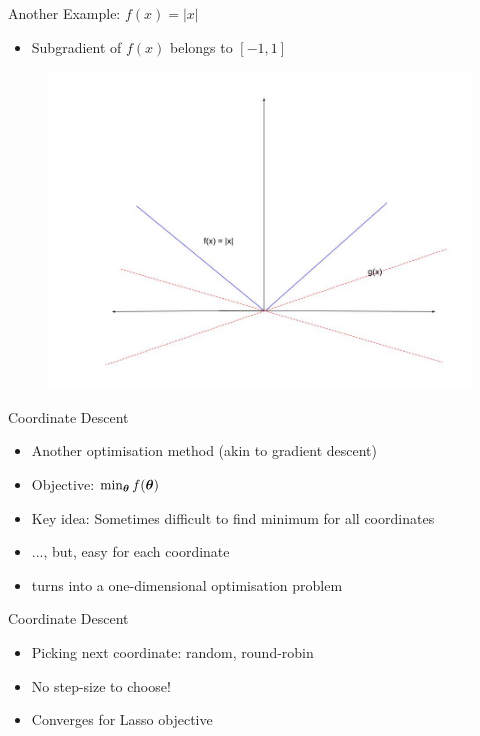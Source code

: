 \documentclass{beamer}
\begin{document}
\begin{frame}{Another Example: $f(x) = |x|$}

\begin{itemize}
\item Subgradient of $f(x)$ belongs to $[-1, 1]$
\end{itemize}
\begin{figure}
\centering
\includegraphics[scale = 0.25]{../assets/lasso/diagrams/subgradient_3.jpg}
\label{fig:my_label}
\end{figure}
\end{frame}

\begin{frame}{Coordinate Descent}
\begin{itemize}[<+->]
	\item Another optimisation method (akin to gradient descent)
	\item Objective: $\min_{\boldsymbol{\theta}} f(\boldsymbol{\theta})$
	\item Key idea: Sometimes difficult to find minimum for all coordinates
	\item ..., but, easy for each coordinate
	\item turns into a one-dimensional optimisation problem
\end{itemize}
\end{frame}

%


\begin{frame}{Coordinate Descent}
\begin{itemize}[<+->]
\item Picking next coordinate: \pause random, round-robin
\item No step-size to choose!
\item Converges for Lasso objective
\end{itemize}
\end{frame}
\end{document}

